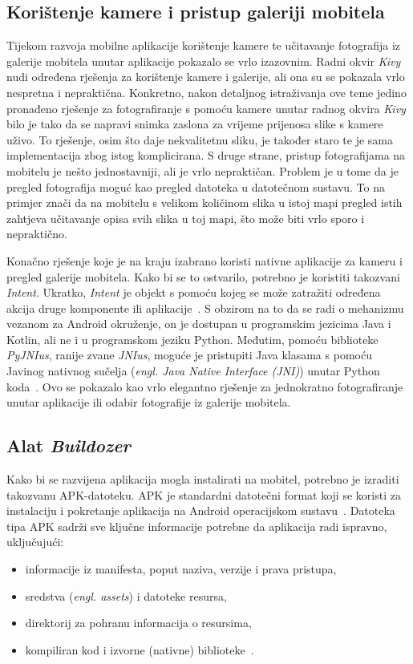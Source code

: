 \documentclass[diplomskirad]{fer}
\begin{document}
		\subsection{Korištenje kamere i pristup galeriji mobitela}
			Tijekom razvoja mobilne aplikacije korištenje kamere te učitavanje fotografija iz galerije mobitela unutar aplikacije pokazalo se vrlo izazovnim. Radni okvir \textit{Kivy} nudi određena rješenja za korištenje kamere i galerije, ali ona su se pokazala vrlo nespretna i nepraktična. Konkretno, nakon detaljnog istraživanja ove teme jedino pronađeno rješenje za fotografiranje s pomoću kamere unutar radnog okvira \textit{Kivy} bilo je tako da se napravi snimka zaslona za vrijeme prijenosa slike s kamere uživo. To rješenje, osim što daje nekvalitetnu sliku, je također staro te je sama implementacija zbog istog komplicirana. S druge strane, pristup fotografijama na mobitelu je nešto jednostavniji, ali je vrlo nepraktičan. Problem je u tome da je pregled fotografija moguć kao pregled datoteka u datotečnom sustavu. To na primjer znači da na mobitelu s velikom količinom slika u istoj mapi pregled istih zahtjeva učitavanje opisa svih slika u toj mapi, što može biti vrlo sporo i nepraktično.
			
			Konačno rješenje koje je na kraju izabrano koristi nativne aplikacije za kameru i pregled galerije mobitela. Kako bi se to ostvarilo, potrebno je koristiti takozvani \textit{Intent}. Ukratko, \textit{Intent} je objekt s pomoću kojeg se može zatražiti određena akcija druge komponente ili aplikacije~\cite{AndroidIntent}. S obzirom na to da se radi o mehanizmu vezanom za Android okruženje, on je dostupan u programskim jezicima Java i Kotlin, ali ne i u programskom jeziku Python. Međutim, pomoću biblioteke \textit{PyJNIus}, ranije zvane \textit{JNIus}, moguće je pristupiti Java klasama s pomoću Javinog nativnog sučelja (\textit{engl. Java Native Interface (JNI)}) unutar Python koda~\cite{GitHubPyJNIus}. Ovo se pokazalo kao vrlo elegantno rješenje za jednokratno fotografiranje unutar aplikacije ili odabir fotografije iz galerije mobitela.
			
			\subsection{Alat \textit{Buildozer}}
			Kako bi se razvijena aplikacija mogla instalirati na mobitel, potrebno je izraditi takozvanu APK-datoteku. APK je standardni datotečni format koji se koristi za instalaciju i pokretanje aplikacija na Android operacijskom sustavu~\cite{KasperskyAPK}. Datoteka tipa APK sadrži sve ključne informacije potrebne da aplikacija radi ispravno, uključujući:
			\begin{itemize}
				\item informacije iz manifesta, poput naziva, verzije i prava pristupa,
				\item sredstva (\textit{engl. assets}) i datoteke resursa,
				\item direktorij za pohranu informacija o resursima,
				\item kompiliran kod i izvorne (nativne) biblioteke~\cite{KasperskyAPK}.
			\end{itemize}
			
\end{document}
